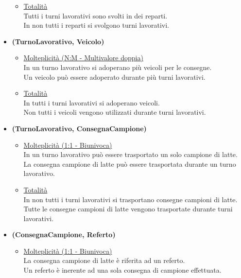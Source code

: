 \documentclass[12pt]{report}
\begin{document}
\begin{itemize}
\begin{itemize}
		\item \underline{Totalità} \\ [2mm]
			Tutti i turni lavorativi sono svolti in dei reparti.\\
            In non tutti i reparti si svolgono turni lavorativi.\\
	\end{itemize}

\newpage

\item \textbf{(TurnoLavorativo, Veicolo) }
	\begin{itemize}
		\item \underline{Molteplicità (N:M - Multivalore doppia) } \\ [2mm]
			In un turno lavorativo si adoperano più veicoli per le consegne.\\
            Un veicolo può essere adoperato durante più turni lavorativi.\\

		\item \underline{Totalità} \\ [2mm]
			In tutti i turni lavorativi si adoperano veicoli. \\
            Non tutti i veicoli vengono utilizzati durante turni lavorativi.\\
	\end{itemize}

\item \textbf{(TurnoLavorativo, ConsegnaCampione) }
	\begin{itemize}
		\item \underline{Molteplicità (1:1 - Biunivoca) } \\ [2mm]
			In un turno lavorativo può essere trasportato un solo campione di latte.\\
            La consegna campione di latte può essere trasportata durante un turno lavorativo.\\

		\item \underline{Totalità} \\ [2mm]
			In non tutti i turni lavorativi si trasportano consegne campioni di latte.\\
		    Tutte le consegne campioni di latte vengono trasportate durante turni lavorativi.\\
	\end{itemize}

\item \textbf{(ConsegnaCampione, Referto) }
	\begin{itemize}
		\item \underline{Molteplicità (1:1 - Biunivoca) } \\ [2mm]
            La consegna campione di latte è riferita ad un referto.\\
            Un referto è inerente ad una sola consegna di campione effettuata.


\end{itemize}
\end{itemize}
\end{document}

